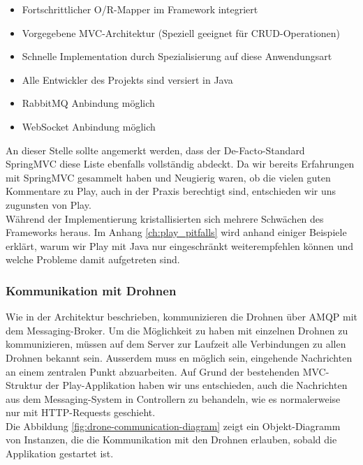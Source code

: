 \begin{itemize}
    \item Fortschrittlicher O/R-Mapper im Framework integriert
    \item Vorgegebene MVC-Architektur (Speziell geeignet für CRUD-Operationen)
    \item Schnelle Implementation durch Spezialisierung auf diese Anwendungsart 
    \item Alle Entwickler des Projekts sind versiert in Java
    \item RabbitMQ Anbindung möglich
    \item WebSocket Anbindung möglich
\end{itemize}
An dieser Stelle sollte angemerkt werden, dass der De-Facto-Standard SpringMVC diese Liste ebenfalls vollständig abdeckt. Da wir bereits Erfahrungen mit SpringMVC gesammelt haben und Neugierig waren, ob die vielen guten Kommentare zu Play, auch in der Praxis berechtigt sind, entschieden wir uns zugunsten von Play.
\\
Während der Implementierung kristallisierten sich mehrere Schwächen des Frameworks heraus. 
Im Anhang \ref{ch:play_pitfalls} wird anhand einiger Beispiele erklärt, warum wir Play mit Java nur eingeschränkt weiterempfehlen können und welche Probleme damit aufgetreten sind.

\subsubsection{Kommunikation mit Drohnen}

Wie in der Architektur beschrieben, kommunizieren die Drohnen über AMQP mit dem Messaging-Broker. Um die Möglichkeit zu haben mit einzelnen Drohnen zu kommunizieren, müssen auf dem Server zur Laufzeit alle Verbindungen zu allen Drohnen bekannt sein. Ausserdem muss en möglich sein, eingehende Nachrichten an einem zentralen Punkt abzuarbeiten. Auf Grund der bestehenden MVC-Struktur der Play-Applikation haben wir uns entschieden, auch die Nachrichten aus dem Messaging-System in Controllern zu behandeln, wie es normalerweise nur mit HTTP-Requests geschieht.\\

Die Abbildung \ref{fig:drone-communication-diagram} zeigt ein Objekt-Diagramm von Instanzen, die die Kommunikation mit den Drohnen erlauben, sobald die Applikation gestartet ist.

